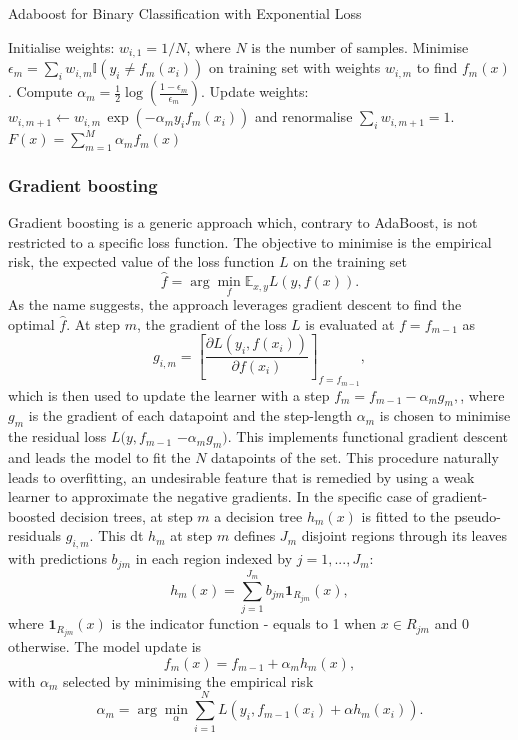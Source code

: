 \begin{algorithm}
    \caption{Adaboost for Binary Classification with Exponential Loss \cite{MurphyML}}
    \label{algo:adaboost}
    \begin{algorithmic}
    \State Initialise weights: $w_{i,1} = 1/N$, where $N$ is the number of samples.
        \State Minimise $\epsilon_m = \sum_i w_{i,m} \mathbb{I}(y_i \neq f_m(x_i))$ on training set with weights $w_{i,m}$ to find $f_m(x)$.
        \State Compute $\alpha_m = \frac{1}{2} \log\left(\frac{1 - \epsilon_m}{\epsilon_m}\right)$.
        \State Update weights: $w_{i,m+1} \leftarrow w_{i,m} \, \exp(-\alpha_m y_i f_m(x_i))$ and renormalise $\sum_i w_{i, m+1} = 1$.
    \EndFor
    \State \Return $F(x) = \sum_{m=1}^M \alpha_m f_m(x)$
    \end{algorithmic}
\end{algorithm}

\subsubsection{Gradient boosting}\label{sec-gradient-boost}
Gradient boosting is a generic approach which, contrary to AdaBoost, is not restricted to a specific loss function. The objective to minimise is the empirical risk, the expected value of the loss function $L$ on the training set 
\begin{equation}\label{eq:empRisk}
    \hat{f}  = \arg \min_f \mathbb{E}_{x,y} L(y, f(x)).
\end{equation}
As the name suggests, the approach leverages gradient descent to find the optimal $\hat{f}$. At step $m$, the gradient of the loss $L$ is evaluated at $f = f_{m-1}$ as \[ g_{i,m} = \left[ \frac{\partial  L(y_i, f(x_i))}{\partial f(x_i)} \right]_{f= f_{m-1}}, \] which is then used to update the learner with a step $f_m = f_{m-1} - \alpha_m g_{m},$, where $g_m$ is the gradient of each datapoint and the step-length $\alpha_m$ is chosen to minimise the residual loss $L(y, f_{m-1}$ $- \alpha_m g_{m})$. This implements functional gradient descent and leads the model to fit the $N$ datapoints of the set. This procedure naturally leads to overfitting, an undesirable feature that is remedied by using a weak learner to approximate the negative gradients. In the specific case of gradient-boosted decision trees, at step $m$ a decision tree $h_m(x)$ is fitted to the pseudo-residuals $g_{i,m}$. This \gls{dt} $h_m$ at step $m$ defines $J_m$ disjoint regions through its leaves with predictions $b_{jm}$ in each region indexed by $j = 1, ..., J_m$: \[ h_m(x) = \sum_{j=1}^{J_m} b_{jm} \textbf{1}_{R_{jm}}(x),\] where $\textbf{1}_{R_{jm}}(x)$ is the indicator function - equals to 1 when $x \in R_{jm}$ and 0 otherwise. The model update is \[f_m(x) = f_{m-1} + \alpha_m h_m(x),\] with $\alpha_m$ selected by minimising the empirical risk \[ \alpha_m = \arg \min_{\alpha} \sum_{i=1}^N L\left(y_i, f_{m-1}(x_i) + \alpha h_m(x_i)\right).\]


